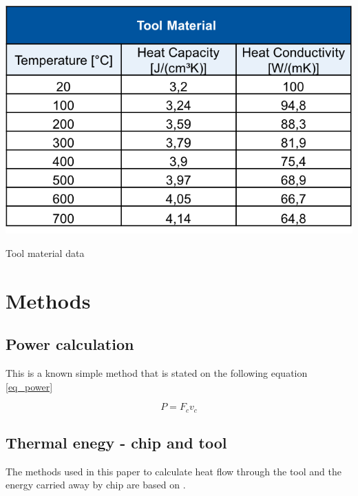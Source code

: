 	\begin{table}[h]
		\centering
		\captionsetup{justification=centering}
		\includegraphics[scale = 0.6]{Imagens/dataTool.png}
		\caption{Tool material data \cite{augspurger2016experimental}}
		\label{tab:dataT}
	\end{table}

	\section{Methods}
	\label{methods}
	
	\subsection{Power calculation}
	This is a known simple method that is stated on the following equation \ref{eq_power}

	\begin{equation} 
	\label{eq_power}
		P = F_{c}v_{c}
	\end{equation}
	
	\subsection{Thermal enegy - chip and tool}
	The methods used in this paper to calculate heat flow through the tool and the energy carried away by chip are based on \cite{boothroyd1963temperatures}.

